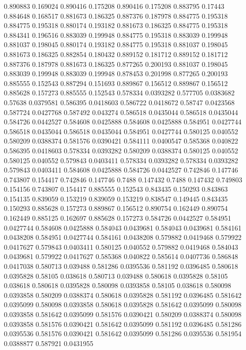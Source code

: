 0.890883 0.169024
0.890416 0.175208
0.890416 0.175208
0.883795 0.17443
0.884648 0.168517
0.881673 0.186325
0.887376 0.187978
0.884775 0.195318
0.884775 0.195318
0.880174 0.193182
0.881673 0.186325
0.884775 0.195318
0.884341 0.196516
0.883039 0.199948
0.884775 0.195318
0.883039 0.199948
0.881037 0.198045
0.880174 0.193182
0.884775 0.195318
0.881037 0.198045
0.881673 0.186325
0.882854 0.180432
0.889152 0.181712
0.889152 0.181712
0.887376 0.187978
0.881673 0.186325
0.877265 0.200193
0.881037 0.198045
0.883039 0.199948
0.883039 0.199948
0.878453 0.201998
0.877265 0.200193
0.885555 0.152543
0.887294 0.151693
0.889867 0.156512
0.889867 0.156512
0.885628 0.157273
0.885555 0.152543
0.578334 0.0393282
0.577705 0.0383682
0.57638 0.0379581
0.586395 0.0418603
0.586722 0.0418672
0.58747 0.0423568
0.587724 0.0427768
0.587492 0.043274
0.586518 0.0435044
0.586518 0.0435044
0.584726 0.0442527
0.584608 0.0425888
0.584608 0.0425888
0.584951 0.0427744
0.586518 0.0435044
0.586518 0.0435044
0.584951 0.0427744
0.580125 0.040552
0.580209 0.0388374
0.581576 0.0390421
0.584111 0.0400547
0.585368 0.040822
0.586395 0.0418603
0.578334 0.0393282
0.580209 0.0388374
0.580125 0.040552
0.580125 0.040552
0.579843 0.0403411
0.578334 0.0393282
0.578334 0.0393282
0.579843 0.0403411
0.584608 0.0425888
0.584726 0.0442527
0.742846 0.147746
0.743807 0.154417
0.742846 0.147746
0.7488 0.147432
0.7488 0.147432
0.749803 0.154156
0.743807 0.154417
0.885555 0.152543
0.843435 0.150293
0.843863 0.154135
0.839059 0.153219
0.839059 0.153219
0.838547 0.149445
0.843435 0.150293
0.885628 0.157273
0.889867 0.156512
0.890754 0.162449
0.890754 0.162449
0.885125 0.162697
0.885628 0.157273
0.584726 0.0442527
0.584951 0.0427744
0.584608 0.0425888
0.584043 0.0439681
0.584043 0.0439681
0.584161 0.0438208
0.584951 0.0427744
0.584161 0.0438208
0.579882 0.0419468
0.579922 0.0417627
0.579843 0.0403411
0.580125 0.040552
0.579882 0.0419468
0.584043 0.0439681
0.579922 0.0417627
0.585368 0.040822
0.585614 0.0407736
0.586848 0.0417038
0.580713 0.039488
0.581286 0.0395536
0.581192 0.0396485
0.580618 0.0395828
0.58105 0.038618
0.580713 0.039488
0.580618 0.0395828
0.58105 0.038618
0.580618 0.0395828
0.580098 0.0393858
0.58105 0.038618
0.580098 0.0393858
0.580209 0.0388374
0.580618 0.0395828
0.581192 0.0396485
0.581642 0.0395099
0.580098 0.0393858
0.580618 0.0395828
0.581642 0.0395099
0.580098 0.0393858
0.581642 0.0395099
0.581576 0.0390421
0.580209 0.0388374
0.580098 0.0393858
0.581576 0.0390421
0.581642 0.0395099
0.581192 0.0396485
0.581286 0.0395536
0.581576 0.0390421
0.581642 0.0395099
0.581286 0.0395536
0.581954 0.0388877
0.587921 0.0431955
